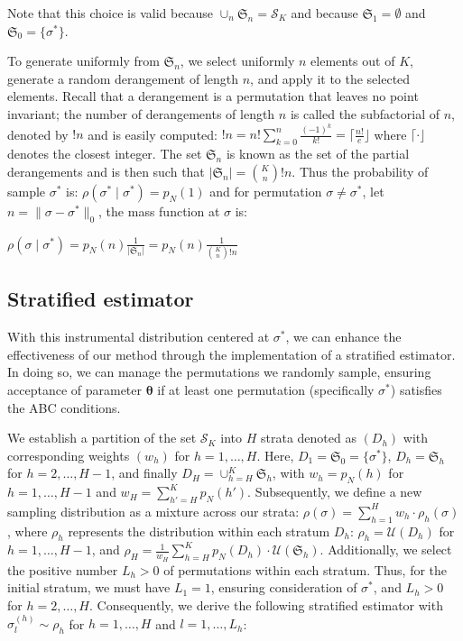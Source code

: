 \documentclass[11pt,a4paper]{article}
\def\iperm{l}
\def\Npermstrat#1{L_{#1}}
\def\parprop{\boldsymbol{\theta}}
\theoremstyle{plain}
\theoremstyle{definition}
\theoremstyle{remark}
\begin{document}
Note that this choice is valid because $\cup_n \mathfrak{S}_n = \mathcal{S}_K$ and because $\mathfrak{S}_1 = \emptyset$ and $\mathfrak{S}_0 = \{\sigma^*\}$. 

To generate uniformly from $\mathfrak S_n$, we select uniformly $n$ elements out of $K$, generate a random derangement of length $n$, and apply it to the selected elements. Recall that a derangement is a permutation that leaves no point invariant; the number of derangements of length $n$ is called the subfactorial of $n$, denoted by $!n$ and is easily computed: $!n = n! \sum_{k=0}^n \frac{(-1)^k}{k!} = \lceil \frac{n!}{e} \rfloor$ where $\lceil \cdot \rfloor$ denotes the closest integer.
The set $\mathfrak{S}_n$ is known as the set of the partial derangements and is then such that $\lvert \mathfrak S_n \rvert = \binom{K}{n} !n$. 
Thus the probability of sample $\sigma^*$ is: $\rho(\sigma^*\mid \sigma^*) = p_N(1)$ and for  permutation $\sigma \neq \sigma^*$, let $n = \lVert\sigma - \sigma^*\rVert_0$,  the mass function at $\sigma$ is:

$\rho(\sigma\mid\sigma^*) = p_N(n)\frac{1}{\lvert \mathfrak{S}_n \rvert} = p_N(n)\frac{1}{\binom{K}{n}!n}$

\subsection{Stratified estimator}

With this instrumental distribution centered at $\sigma^*$, we can enhance the effectiveness of our method through the implementation of a stratified estimator. In doing so, we can manage the permutations we randomly sample, ensuring acceptance of parameter $\parprop$ if at least one permutation (specifically $\sigma^*$) satisfies the ABC conditions.

We establish a partition of the set $\mathcal S_K$ into $H$ strata denoted as $(D_h)$ with corresponding weights $(w_h)$ for $h=1,\dots,H$. Here, $D_1 = \mathfrak S_0 = \{ \sigma^* \}$, $D_h = \mathfrak S_h$ for $h = 2,\dots,H-1$, and finally $D_H = \cup_{h=H}^K \mathfrak S_h$, with $w_h = p_N(h)$ for $h=1,\dots,H-1$ and $w_H = \sum_{h'=H}^K p_N(h')$. Subsequently, we define a new sampling distribution as a mixture across our strata: $\rho(\sigma)= \sum_{h=1}^H w_h \cdot \rho_h(\sigma)$, where $\rho_h$ represents the distribution within each stratum $D_h$: $\rho_h = \mathcal U(D_h)$ for $h=1,\dots,H-1$, and $\rho_H = \frac{1}{w_H}\sum_{h=H}^K p_N(D_h)\cdot \mathcal U(\mathfrak S_h)$. Additionally, we select the positive number $\Npermstrat{h}>0$ of permutations within each stratum. Thus, for the initial stratum, we must have $\Npermstrat{1} = 1$, ensuring consideration of $\sigma^*$, and $\Npermstrat{h}>0$ for $h=2,\dots,H$. Consequently, we derive the following stratified estimator with $\sigma_{\iperm}^{(h)} \sim \rho_h$ for $h=1,\dots,H$ and $\iperm=1,\dots,\Npermstrat{h}$:
\end{document}
